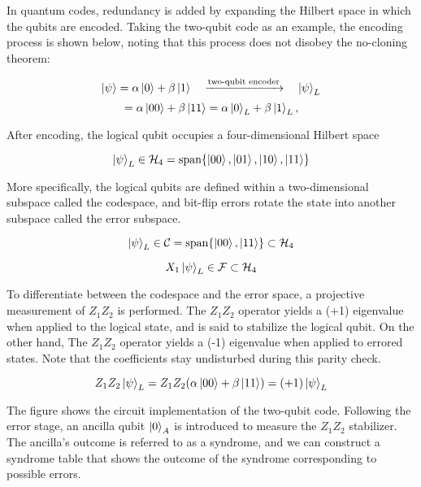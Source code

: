 In quantum codes, redundancy is added by expanding the Hilbert space in which the qubits are encoded. Taking the two-qubit code as an example, the encoding process is shown below, noting that this process does not disobey the no-cloning theorem:

\[
    \ket{\psi} = \alpha \ket{0} + \beta \ket{1}
    \quad
    \xrightarrow{\text{two-qubit encoder}}
    \quad
    \ket{\psi}_L
\]
\[
    = \alpha \ket{00} + \beta \ket{11} = \alpha \ket{0}_L + \beta \ket{1}_L,
\]

After encoding, the logical qubit occupies a four-dimensional Hilbert space

\[
    \ket{\psi}_L \in \mathcal{H}_4 = \text{span}\{\ket{00}, \ket{01}, \ket{10}, \ket{11}\}
\]

More specifically, the logical qubits are defined within a two-dimensional subspace called the codespace, and bit-flip errors rotate the state into another subspace called the error subspace.

\[
    \ket{\psi}_L \in \mathcal{C} = \text{span}\{\ket{00}, \ket{11}\} \subset \mathcal{H}_4
\]

\[
    X_1 \ket{\psi}_L \in \mathcal{F} \subset \mathcal{H}_4
\]

To differentiate between the codespace and the error space, a projective measurement of $Z_1Z_2$ is performed. The $Z_1Z_2$ operator yields a (+1) eigenvalue when applied to the logical state, and is said to stabilize the logical qubit. On the other hand, The $Z_1Z_2$ operator yields a (-1) eigenvalue when applied to errored states. Note that the coefficients stay undisturbed during this parity check.

\[
    Z_1Z_2\ket{\psi}_L = Z_1Z_2(\alpha \ket{00} + \beta \ket{11}) = (+1) \ket{\psi}_L
\]

The figure shows the circuit implementation of the two-qubit code. Following the error stage, an ancilla qubit $\ket{0}_A$ is introduced to measure the $Z_1Z_2$ stabilizer. The ancilla's outcome is referred to as a syndrome, and we can construct a syndrome table that shows the outcome of the syndrome corresponding to possible errors.

